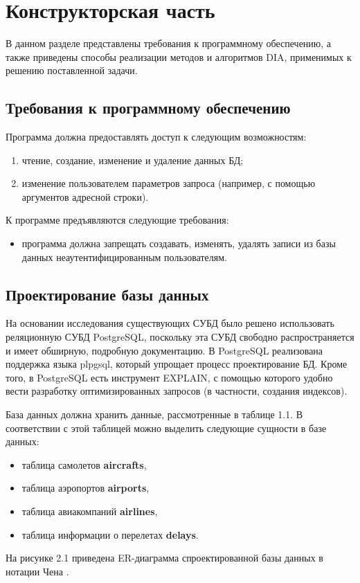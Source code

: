 \chapter{Конструкторская часть}

В данном разделе представлены требования к программному обеспечению, а также приведены способы реализации методов и алгоритмов DIA, применимых к решению поставленной задачи.


\section{Требования к программному обеспечению}

Программа должна предоставлять доступ к следующим возможностям:
\begin{enumerate}
	\item чтение, создание, изменение и удаление данных БД;
	\item изменение пользователем параметров запроса (например, с помощью аргументов адресной строки).
\end{enumerate}

К программе предъявляются следующие требования:
\begin{itemize}
	\item программа должна запрещать создавать, изменять, удалять записи из базы данных неаутентифицированным пользователям.
\end{itemize}


\section{Проектирование базы данных}

На основании исследования существующих СУБД было решено использовать реляционную СУБД PostgreSQL, поскольку эта СУБД свободно распространяется и имеет обширную, подробную документацию. В PostgreSQL реализована поддержка языка plpgsql, который упрощает процесс проектирование БД. Кроме того,
в PostgreSQL есть инструмент EXPLAIN, с помощью которого удобно вести разработку оптимизированных запросов (в частности, создания индексов).


База данных должна хранить данные, рассмотренные в таблице 1.1. В соответствии с этой таблицей можно выделить следующие сущности в базе данных:
\begin{itemize}
	\item таблица самолетов \textbf{aircrafts},
	\item таблица аэропортов \textbf{airports},
	\item таблица авиакомпаний \textbf{airlines},
	\item таблица информации о перелетах \textbf{delays}.
\end{itemize}
На рисунке 2.1 приведена ER-диаграмма спроектированной базы данных в нотации Чена \cite{chen}.



